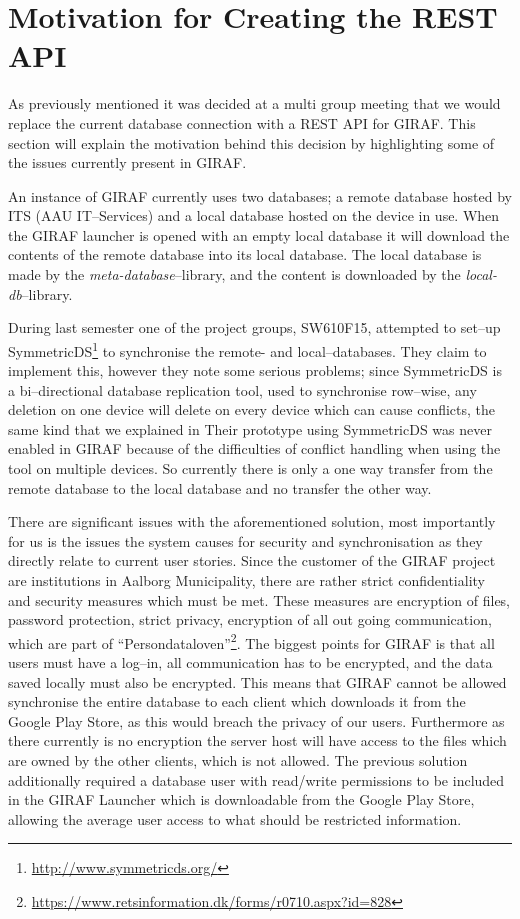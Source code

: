 \section{Motivation for Creating the REST API}\label{sec:current}

As previously mentioned it was decided at a multi group meeting that we would replace the current database connection with a REST API for GIRAF.
This section will explain the motivation behind this decision by highlighting some of the issues currently present in GIRAF.

An instance of GIRAF currently uses two databases; a remote database hosted by ITS (AAU IT--Services) and a local database hosted on the device in use.
When the GIRAF launcher is opened with an empty local database it will download the contents of the remote database into its local database.
The local database is made by the \textit{meta-database}--library, and the content is downloaded by the \textit{local-db}--library.

During last semester one of the project groups, SW610F15, attempted to set--up SymmetricDS\footnote{\url{http://www.symmetricds.org/}} to synchronise the remote- and local--databases.
They claim to implement this, however they note some serious problems; since SymmetricDS is a bi--directional database replication tool, used to synchronise row--wise, any deletion on one device will delete on every device which can cause conflicts, the same kind that we explained in 
Their prototype using SymmetricDS was never enabled in GIRAF because of the difficulties of conflict handling when using the tool on multiple devices.
So currently there is only a one way transfer from the remote database to the local database and no transfer the other way.

\bigskip
There are significant issues with the aforementioned solution, most importantly for us is the issues the system causes for security and synchronisation as they directly relate to current user stories.
Since the customer of the GIRAF project are institutions in Aalborg Municipality, there are rather strict confidentiality and security measures which must be met.
These measures are encryption of files, password protection, strict privacy, encryption of all out going communication, which are part of ``Persondataloven''\footnote{\url{https://www.retsinformation.dk/forms/r0710.aspx?id=828}}.
The biggest points for GIRAF is that all users must have a log--in, all communication has to be encrypted, and the data saved locally must also be encrypted.
This means that GIRAF cannot be allowed synchronise the entire database to each client which downloads it from the Google Play Store, as this would breach the privacy of our users.
Furthermore as there currently is no encryption the server host will have access to the files which are owned by the other clients, which is not allowed.
The previous solution additionally required a database user with read/write permissions to be included in the GIRAF Launcher which is downloadable from the Google Play Store, allowing the average user access to what should be restricted information.

